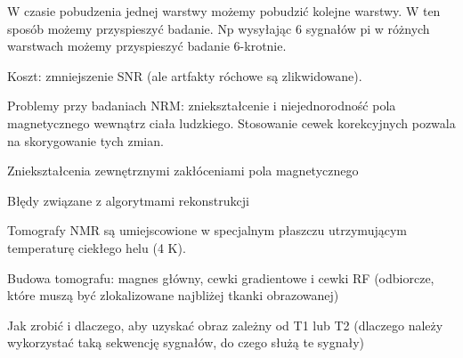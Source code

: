 \documentclass{article}
\begin{document}
W czasie pobudzenia jednej warstwy możemy pobudzić kolejne warstwy. W ten sposób możemy przyspieszyć badanie. Np wysyłając 6 sygnałów pi w różnych warstwach możemy przyspieszyć badanie 6-krotnie.

Koszt: zmniejszenie SNR (ale artfakty róchowe są zlikwidowane).

Problemy przy badaniach NRM: zniekształcenie i niejednorodność pola magnetycznego wewnątrz ciała ludzkiego. Stosowanie cewek korekcyjnych pozwala na skorygowanie tych zmian.

Zniekształcenia zewnętrznymi zakłóceniami pola magnetycznego

Błędy związane z algorytmami rekonstrukcji

Tomografy NMR są umiejscowione w specjalnym płaszczu utrzymującym temperaturę ciekłego helu (4 K).

Budowa tomografu: magnes główny, cewki gradientowe i cewki RF (odbiorcze, które muszą być zlokalizowane najbliżej tkanki obrazowanej)

Jak zrobić i dlaczego, aby uzyskać obraz zależny od T1 lub T2 (dlaczego należy wykorzystać taką sekwencję sygnałów, do czego służą te sygnały)
\end{document}
